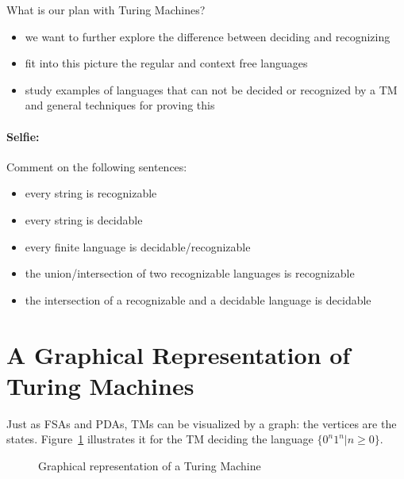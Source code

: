 What is our plan with Turing Machines?

\begin{itemize}
\item we want to further explore the difference between deciding and
  recognizing
\item fit into this picture the regular and context free
  languages
\item study examples of languages that can not be decided or
  recognized by a TM and general techniques for proving this
\end{itemize}



\paragraph{Selfie:} Comment on the following sentences:

\begin{itemize}
\item every string is recognizable
\item every string is decidable
\item every finite language is decidable/recognizable
\item the union/intersection of two recognizable languages is recognizable
\item the intersection of a recognizable and a decidable language is
  decidable
\end{itemize}





\section{A Graphical Representation of Turing Machines}

Just as FSAs and PDAs, TMs can be visualized by a graph: the vertices
are the states. Figure~\ref{turing2} illustrates it for the TM
deciding the language $\{0^n1^n|n \geq 0\}$.




\begin{figure}[h]
\caption{Graphical representation of a Turing Machine\label{turing2}}
\end{figure}

